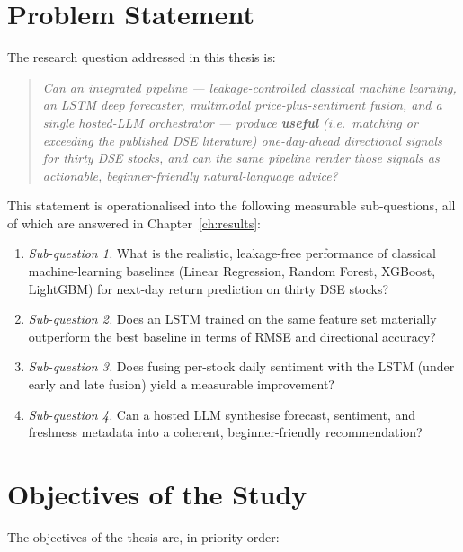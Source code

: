 \documentclass[12pt,a4paper,oneside]{report}
\begin{document}
\section{Problem Statement}

The research question addressed in this thesis is:

\begin{quote}
\emph{Can an integrated pipeline --- leakage-controlled classical
machine learning, an \ac{LSTM} deep forecaster, multimodal
price-plus-sentiment fusion, and a single hosted-\ac{LLM}
orchestrator --- produce \textbf{useful} (i.e.\ matching or
exceeding the published DSE literature) one-day-ahead directional
signals for thirty DSE stocks, and can the same pipeline render
those signals as actionable, beginner-friendly natural-language
advice?}
\end{quote}

This statement is operationalised into the following measurable
sub-questions, all of which are answered in Chapter~\ref{ch:results}:

\begin{enumerate}[leftmargin=*,itemsep=2pt]
  \item \emph{Sub-question 1.} What is the realistic, leakage-free
        performance of classical machine-learning baselines (Linear
        Regression, Random Forest, XGBoost, LightGBM) for next-day
        return prediction on thirty DSE stocks?
  \item \emph{Sub-question 2.} Does an \ac{LSTM} trained on the same
        feature set materially outperform the best baseline in terms
        of \ac{RMSE} and directional accuracy?
  \item \emph{Sub-question 3.} Does fusing per-stock daily sentiment
        with the \ac{LSTM} (under early and late fusion) yield a
        measurable improvement?
  \item \emph{Sub-question 4.} Can a hosted \ac{LLM} synthesise
        forecast, sentiment, and freshness metadata into a coherent,
        beginner-friendly recommendation?
\end{enumerate}

\section{Objectives of the Study}

The objectives of the thesis are, in priority order:
\end{document}
